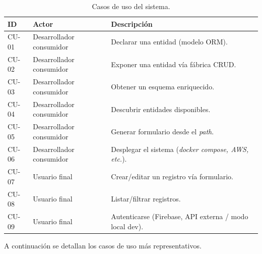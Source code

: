 \begin{table}[H]
\caption{Casos de uso del sistema.}
\label{tab:cu}
\centering
\begin{tabular}{|l|l|p{6.5cm}|}
\hline
\textbf{ID} & \textbf{Actor} & \textbf{Descripción} \\ \hline
CU-01 & Desarrollador consumidor & Declarar una entidad (modelo ORM). \\ \hline
CU-02 & Desarrollador consumidor & Exponer una entidad vía fábrica CRUD. \\ \hline
CU-03 & Desarrollador consumidor & Obtener un esquema enriquecido. \\ \hline
CU-04 & Desarrollador consumidor & Descubrir entidades disponibles. \\ \hline
CU-05 & Desarrollador consumidor & Generar formulario desde el \emph{path}. \\ \hline
CU-06 & Desarrollador consumidor & Desplegar el sistema (\emph{docker compose, AWS, etc.}). \\ \hline
CU-07 & Usuario final & Crear/editar un registro vía formulario. \\ \hline
CU-08 & Usuario final & Listar/filtrar registros. \\ \hline
CU-09 & Usuario final & Autenticarse (Firebase, API externa / modo local dev). \\ \hline
\end{tabular}
\end{table}

A continuación se detallan los casos de uso más representativos.

